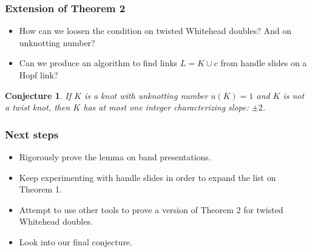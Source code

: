 \documentclass{beamer}
\newtheorem{conjecture}[theorem]{Conjecture}
\theoremstyle{ex}
\theoremstyle{rem}
\begin{document}
\begin{frame}
	\frametitle{Extension of Theorem 2}
	\begin{itemize}
		\item How can we loosen the condition on twisted Whitehead doubles? And on unknotting number?
		\item Can we produce an algorithm to find links $L = K \cup c$ from handle slides on a Hopf link?
	\end{itemize}
	\begin{conjecture}
		If $K$ is a knot with unknotting number $u(K) = 1$ and $K$ is not a twist knot, then $K$ has at most \textit{one} integer characterizing slope: $\pm 2$.
	\end{conjecture}
\end{frame}

\begin{frame}
	\frametitle{Next steps}
	\begin{itemize}
		\item Rigorously prove the lemma on band presentations.
		\item Keep experimenting with handle slides in order to expand the list on Theorem 1.
		\item Attempt to use other tools to prove a version of Theorem 2 for twisted Whitehead doubles.
		\item Look into our final conjecture.
	\end{itemize}
\end{frame}
\end{document}
